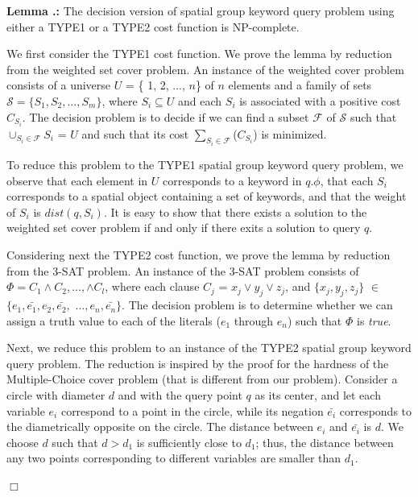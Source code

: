 \documentclass{sig-alternate}
\newcounter{theorem}[section]
\renewcommand{\thetheorem}{\nthesection.\arabic{theorem}}
\newenvironment{lemma}{\begin{em}
    \refstepcounter{theorem}
    {\vspace{1ex} \noindent\bf  Lemma  \thetheorem:}}{
    \end{em}\eop\vspace{1ex}} %
\newcommand{\nthesection}{\arabic{section}}
\newcommand{\eop}{\hspace*{\fill}\mbox{$\Box$}}
\begin{document}
\begin{lemma} \label{lemma:nphard1} The decision version of
  spatial group keyword query
  problem using either a \textsc{TYPE1} or a \textsc{TYPE2} cost
  function is NP-complete.

  \proof We first consider the \textsc{TYPE1} cost function. We prove
  the lemma by reduction from the weighted set cover problem. An
  instance of the weighted cover problem consists of a universe $U$ =
  \{ 1, 2, ..., $n$\} of $n$ elements and a family of sets
  $\mathcal{S} = \{ S_1, S_2,..., S_m\}$, where $S_i \subseteq U$ and
  each $S_i$ is associated with a positive cost $C_{S_i}$. The
  decision problem is to decide if we can
  find a subset $\mathcal{F}$ of $\mathcal{S}$
  such that $\cup_{S_i \in \mathcal{F}}$$S_i$ = $U$ and such that its
  cost $\sum_{S_i \in \mathcal{F}}$($C_{S_i}$) is minimized.

  To reduce this problem to the \textsc{TYPE1} spatial group keyword query problem, we observe that%
  each element in $U$ corresponds to a keyword in
  $q.\phi$, that each $S_i$ corresponds to a spatial object containing a
  set of keywords, and that the weight of $S_i$ is $dist(q, S_i)$. It is
  easy to show that there exists a solution to the weighted set cover
  problem if and only if there exits a solution to query $q$.


  Considering next the \textsc{TYPE2} cost function, we prove the
  lemma by reduction from the 3-SAT problem. An instance of the 3-SAT
  problem consists of $\Phi = C_1 \wedge C_2, ..., \wedge C_l$, where
  each clause $C_j$ = $x_j \vee y_j \vee z_j $, and $\{x_j, y_j, z_j
  \}$ $\in$ $\{e_1, \bar{e_1}, e_2, \bar{e_2},$ $..., e_n,
  \bar{e_n}\}$. The decision problem is to determine whether we can
  assign a truth value to each of the literals ($e_1$ through $e_n$)
  such that $\Phi$ is \emph{true}.

  Next, we reduce this problem to an instance of the \textsc{TYPE2} spatial
  group keyword query problem. The reduction is inspired by the proof for the hardness of
  the Multiple-Choice cover problem \cite{multicover} (that is
  different from our problem).
%
  Consider a circle with diameter $d$ and with the query point $q$
  as its center, and let each variable $e_i$
  correspond to a point in the circle, while its negation $\bar{e_i}$
  corresponds to the diametrically opposite on the circle. The
  distance between $e_i$ and $\bar{e_i}$ is $d$. We choose $d$
  such that $d > d_1$ is sufficiently close to $d_1$; thus, the
  distance between any two points corresponding to different variables
  are smaller than $d_1$.


\end{lemma}
\end{document}
